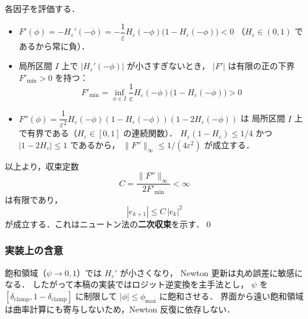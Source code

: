 各因子を評価する．
\begin{itemize}
  \item $F'(\phi) = -H_\varepsilon'(-\phi) =
        -\dfrac{1}{\varepsilon}H_\varepsilon(-\phi)\bigl(1-H_\varepsilon(-\phi)\bigr) < 0$
        （$H_\varepsilon \in (0,1)$ であるから常に負）．

  \item 局所区間 $I$ 上で $|H_\varepsilon'(-\phi)|$ が小さすぎないとき，
        $|F'|$ は有限の正の下界 $F'_{\min} > 0$ を持つ：
        \[
          F'_{\min} = \inf_{\phi\in I}
          \frac{1}{\varepsilon}H_\varepsilon(-\phi)\bigl(1-H_\varepsilon(-\phi)\bigr) > 0
        \]

  \item $F''(\phi) = \dfrac{1}{\varepsilon^2}H_\varepsilon(-\phi)(1-H_\varepsilon(-\phi))(1-2H_\varepsilon(-\phi))$ は
        局所区間 $I$ 上で有界である（$H_\varepsilon \in [0,1]$ の連続関数）．
        $H_\varepsilon(1-H_\varepsilon) \le 1/4$ かつ $|1-2H_\varepsilon| \le 1$ であるから，
        $\|F''\|_\infty \le 1/(4\varepsilon^2)$ が成立する．
\end{itemize}

以上より，収束定数
\[
  C = \frac{\|F''\|_\infty}{2 F'_{\min}}
    < \infty
\]
は有限であり，
\[
  |e_{k+1}| \le C\,|e_k|^2
\]
が成立する．これはニュートン法の\textbf{二次収束}を示す．\qed

\subsubsection*{実装上の含意}

飽和領域（$\psi \to 0,1$）では $H_\varepsilon'$ が小さくなり，
Newton 更新は丸め誤差に敏感になる．
したがって本稿の実装ではロジット逆変換を主手法とし，
$\psi$ を $[\delta_{\text{clamp}},1-\delta_{\text{clamp}}]$ に制限して
$|\phi|\le\phi_{\max}$ に飽和させる．
界面から遠い飽和領域は曲率計算にも寄与しないため，Newton 反復に依存しない．

